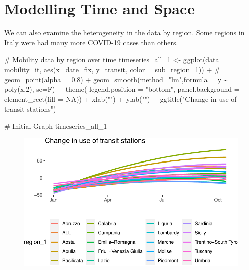 \documentclass[
  letterpaper,
  DIV=11,
  numbers=noendperiod]{scrreprt}
\newenvironment{Shaded}{\begin{snugshade}}{\end{snugshade}}
\newcommand{\AttributeTok}[1]{\textcolor[rgb]{0.40,0.45,0.13}{#1}}
\newcommand{\CommentTok}[1]{\textcolor[rgb]{0.37,0.37,0.37}{#1}}
\newcommand{\ConstantTok}[1]{\textcolor[rgb]{0.56,0.35,0.01}{#1}}
\newcommand{\DecValTok}[1]{\textcolor[rgb]{0.68,0.00,0.00}{#1}}
\newcommand{\FunctionTok}[1]{\textcolor[rgb]{0.28,0.35,0.67}{#1}}
\newcommand{\NormalTok}[1]{\textcolor[rgb]{0.00,0.23,0.31}{#1}}
\newcommand{\OtherTok}[1]{\textcolor[rgb]{0.00,0.23,0.31}{#1}}
\newcommand{\SpecialCharTok}[1]{\textcolor[rgb]{0.37,0.37,0.37}{#1}}
\newcommand{\StringTok}[1]{\textcolor[rgb]{0.13,0.47,0.30}{#1}}
\begin{document}
\hypertarget{modelling-time-and-space}{%
\section{Modelling Time and Space}\label{modelling-time-and-space}}

We can also examine the heterogeneity in the data by region. Some
regions in Italy were had many more COVID-19 cases than others.

\begin{Shaded}
\begin{Highlighting}[]
\CommentTok{\# Mobility data by region over time}
\NormalTok{timeseries\_all\_1 }\OtherTok{\textless{}{-}} \FunctionTok{ggplot}\NormalTok{(}\AttributeTok{data =}\NormalTok{ mobility\_it, }\FunctionTok{aes}\NormalTok{(}\AttributeTok{x=}\NormalTok{date\_fix, }\AttributeTok{y=}\NormalTok{transit, }\AttributeTok{color =}\NormalTok{ sub\_region\_1)) }\SpecialCharTok{+}
  \CommentTok{\# geom\_point(alpha = 0.8) + }
  \FunctionTok{geom\_smooth}\NormalTok{(}\AttributeTok{method=}\StringTok{"lm"}\NormalTok{,}\AttributeTok{formula =}\NormalTok{ y }\SpecialCharTok{\textasciitilde{}} \FunctionTok{poly}\NormalTok{(x,}\DecValTok{2}\NormalTok{), }\AttributeTok{se=}\NormalTok{F) }\SpecialCharTok{+}
  \FunctionTok{theme}\NormalTok{(}
  \AttributeTok{legend.position =} \StringTok{"bottom"}\NormalTok{,}
  \AttributeTok{panel.background =} \FunctionTok{element\_rect}\NormalTok{(}\AttributeTok{fill =} \ConstantTok{NA}\NormalTok{)) }\SpecialCharTok{+}
  \FunctionTok{xlab}\NormalTok{(}\StringTok{""}\NormalTok{) }\SpecialCharTok{+}
  \FunctionTok{ylab}\NormalTok{(}\StringTok{""}\NormalTok{) }\SpecialCharTok{+}
  \FunctionTok{ggtitle}\NormalTok{(}\StringTok{"Change in use of transit stations"}\NormalTok{) }

\CommentTok{\# Initial Graph}
\NormalTok{timeseries\_all\_1  }
\end{Highlighting}
\end{Shaded}

\begin{figure}[H]

{\centering \includegraphics{longitudinal-1_files/figure-pdf/unnamed-chunk-16-1.pdf}

}

\end{figure}
\end{document}
